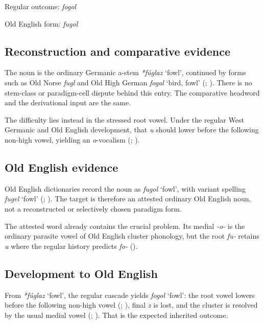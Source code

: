 \documentclass[
  british,
  a4paper,
  openany]{book}
\providecommand{\Recon}[1]{\emph{*#1}}
{\catcode`→=\active \global\def→{\ensuremath{\rightarrow}}}
\providecommand{\Recon}[1]{\emph{*#1}}
{\catcode`→=\active \global\def→{\ensuremath{\rightarrow}}}
\begin{document}
Regular outcome: \emph{fogol}

Old English form: \emph{fugol}

\subsection{Reconstruction and comparative
evidence}\label{reconstruction-and-comparative-evidence-143}

The noun is the ordinary Germanic a-stem \Recon{fúglaz} `fowl',
continued by forms such as Old Norse \emph{fugl} and Old High German
{\emph{fogal}} `bird, fowl' (; ). There is no stem-class
or paradigm-cell dispute behind this entry. The comparative headword and
the derivational input are the same.

The difficulty lies instead in the stressed root vowel. Under the
regular West Germanic and Old English development, that \emph{u} should
lower before the following non-high vowel, yielding an \emph{o}-vocalism
(;
).

\subsection{Old English evidence}\label{old-english-evidence-143}

Old English dictionaries record the noun as \emph{fugol} `fowl', with
variant spelling \emph{fugel} `fowl'
(;
). The target is
therefore an attested ordinary Old English noun, not a reconstructed or
selectively chosen paradigm form.

The attested word already contains the crucial problem. Its medial
\emph{-o-} is the ordinary parasite vowel of Old English cluster
phonology, but the root \emph{fu-} retains \emph{u} where the regular
history predicts \emph{fo-} ().

\subsection{Development to Old
English}\label{development-to-old-english-143}

From \Recon{fúglaz} `fowl', the regular cascade yields \emph{fogol}
`fowl': the root vowel lowers before the following non-high vowel
(;
), final \emph{z} is lost,
and the cluster is resolved by the usual medial vowel
(;
). That is the expected
inherited outcome.
\end{document}
